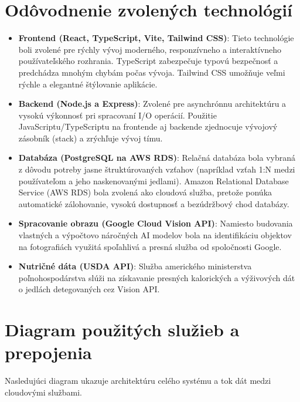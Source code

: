 \documentclass[12pt, a4paper]{article}
\begin{document}
\section{Odôvodnenie zvolených technológií}
\begin{itemize}
    \item \textbf{Frontend (React, TypeScript, Vite, Tailwind CSS)}: Tieto technológie boli zvolené pre rýchly vývoj moderného, responzívneho a interaktívneho používateľského rozhrania. TypeScript zabezpečuje typovú bezpečnosť a predchádza mnohým chybám počas vývoja. Tailwind CSS umožňuje veľmi rýchle a elegantné štýlovanie aplikácie.
    \item \textbf{Backend (Node.js a Express)}: Zvolené pre asynchrónnu architektúru a vysokú výkonnosť pri spracovaní I/O operácií. Použitie JavaScriptu/TypeScriptu na frontende aj backende zjednocuje vývojový zásobník (stack) a zrýchľuje vývoj tímu.
    \item \textbf{Databáza (PostgreSQL na AWS RDS)}: Relačná databáza bola vybraná z dôvodu potreby jasne štruktúrovaných vzťahov (napríklad vzťah 1:N medzi používateľom a jeho naskenovanými jedlami). Amazon Relational Database Service (AWS RDS) bola zvolená ako cloudová služba, pretože ponúka automatické zálohovanie, vysokú dostupnosť a bezúdržbový chod databázy.
    \item \textbf{Spracovanie obrazu (Google Cloud Vision API)}: Namiesto budovania vlastných a výpočtovo náročných AI modelov bola na identifikáciu objektov na fotografiách využitá spoľahlivá a presná služba od spoločnosti Google.
    \item \textbf{Nutričné dáta (USDA API)}: Služba amerického ministerstva poľnohospodárstva slúži na získavanie presných kalorických a výživových dát o jedlách detegovaných cez Vision API.
\end{itemize}

\section{Diagram použitých služieb a prepojenia}
Nasledujúci diagram ukazuje architektúru celého systému a tok dát medzi cloudovými službami.
\end{document}
